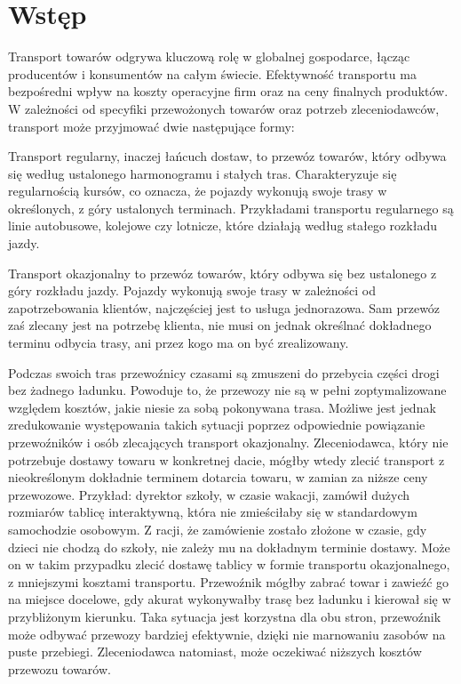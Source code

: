 \chapter{Wstęp}

Transport towarów odgrywa kluczową rolę w globalnej gospodarce, łącząc producentów i konsumentów na całym świecie. Efektywność transportu ma bezpośredni wpływ na koszty operacyjne firm oraz na ceny finalnych produktów. W zależności od specyfiki przewożonych towarów oraz potrzeb zleceniodawców, transport może przyjmować dwie następujące formy:

\label{sec:przewoz_regularny}
Transport regularny, inaczej łańcuch dostaw, to przewóz towarów, który odbywa się według ustalonego harmonogramu i stałych tras. Charakteryzuje się regularnością kursów, co oznacza, że pojazdy wykonują swoje trasy w określonych, z góry ustalonych terminach. Przykładami transportu regularnego są linie autobusowe, kolejowe czy lotnicze, które działają według stałego rozkładu jazdy.

\label{sec:transport_okazjonalny}
Transport okazjonalny to przewóz towarów, który odbywa się bez ustalonego z góry rozkładu jazdy. Pojazdy wykonują swoje trasy w zależności od zapotrzebowania klientów, najczęściej jest to usługa jednorazowa. Sam przewóz zaś zlecany jest na potrzebę klienta, nie musi on jednak określnać dokładnego terminu odbycia trasy, ani przez kogo ma on być zrealizowany.

Podczas swoich tras przewoźnicy czasami są zmuszeni do przebycia części drogi bez żadnego ładunku. Powoduje to, że przewozy nie są w pełni zoptymalizowane względem kosztów, jakie niesie za sobą pokonywana trasa. Możliwe jest jednak zredukowanie występowania takich sytuacji poprzez odpowiednie powiązanie przewoźników i osób zlecających transport okazjonalny. Zleceniodawca, który nie potrzebuje dostawy towaru w konkretnej dacie, mógłby wtedy zlecić transport z nieokreślonym dokładnie terminem dotarcia towaru, w zamian za niższe ceny przewozowe. Przykład: dyrektor szkoły, w czasie wakacji, zamówił dużych rozmiarów tablicę interaktywną, która nie zmieściłaby się w standardowym samochodzie osobowym. Z racji, że zamówienie zostało złożone w czasie, gdy dzieci nie chodzą do szkoły, nie zależy mu na dokładnym terminie dostawy. Może on w takim przypadku zlecić dostawę tablicy w formie transportu okazjonalnego, z mniejszymi kosztami transportu. Przewoźnik mógłby zabrać towar i zawieźć go na miejsce docelowe, gdy akurat wykonywałby trasę bez ładunku i kierował się w przybliżonym kierunku. Taka sytuacja jest korzystna dla obu stron, przewoźnik może odbywać przewozy bardziej efektywnie, dzięki nie marnowaniu zasobów na puste przebiegi. Zleceniodawca natomiast, może oczekiwać niższych kosztów przewozu towarów.

